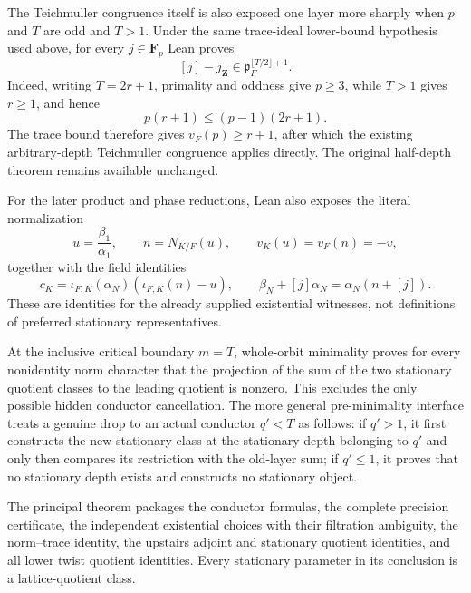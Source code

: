 \begin{theorem}
The Teichmuller congruence itself is also exposed one layer more sharply
when $p$ and $T$ are odd and $T>1$.  Under the same trace-ideal lower-bound
hypothesis used above, for every $j\in\mathbf F_p$ Lean proves
\[
 [j]-j_{\mathbf Z}\in\mathfrak p_F^{\lfloor T/2\rfloor+1}.
\]
Indeed, writing $T=2r+1$, primality and oddness give $p\ge3$, while $T>1$
gives $r\ge1$, and hence
\[
 p(r+1)\le(p-1)(2r+1).
\]
The trace bound therefore gives $v_F(p)\ge r+1$, after which the existing
arbitrary-depth Teichmuller congruence applies directly.  The original
half-depth theorem remains available unchanged.

For the later product and phase reductions, Lean also exposes the literal
normalization
\[
 u=\frac{\beta_1}{\alpha_1},\qquad n=N_{K/F}(u),\qquad
 v_K(u)=v_F(n)=-v,
\]
together with the field identities
\[
 c_K=\iota_{F,K}(\alpha_N)(\iota_{F,K}(n)-u),\qquad
 \beta_N+[j]\alpha_N=\alpha_N(n+[j]).
\]
These are identities for the already supplied existential witnesses, not
definitions of preferred stationary representatives.

At the inclusive critical boundary $m=T$, whole-orbit minimality proves
for every nonidentity norm character that the projection of the sum of the
two stationary quotient classes to the leading quotient is nonzero.  This
excludes the only possible hidden conductor cancellation.  The more general
pre-minimality interface treats a genuine drop to an actual conductor
$q'<T$ as follows: if $q'>1$, it first constructs the new stationary class
at the stationary depth belonging to $q'$ and only then compares its
restriction with the old-layer sum; if $q'\le1$, it proves that no
stationary depth exists and constructs no stationary object.

The principal theorem packages the conductor formulas, the complete
precision certificate, the independent existential choices with their
filtration ambiguity, the norm--trace identity, the upstairs adjoint and
stationary quotient identities, and all lower twist quotient identities.
Every stationary parameter in its conclusion is a lattice-quotient class.


\end{theorem}
